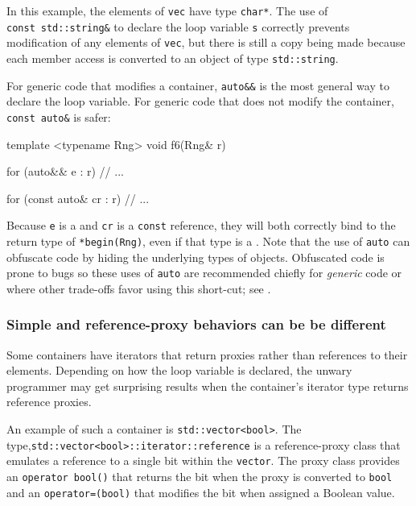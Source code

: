 {{{\noindent In this example, the elements of \lstinline!vec! have type \lstinline!char*!.
The use of \lstinline!const!~\lstinline!std::string&! to declare the loop
variable \lstinline!s! correctly prevents modification of any elements of
\lstinline!vec!, but there is still a copy being made because each member
access is converted to an object of type \lstinline!std::string!.

For generic code that modifies a container, \lstinline!auto&&! is the
most general way to declare the loop variable. For generic code that
does not modify the container, \lstinline!const!~\lstinline!auto&! is safer:

\begin{emcppslisting}[emcppsbatch=e5]
template <typename Rng>
void f6(Rng& r)
{
    for (auto&& e : r)
    {
        // ...
    }

    for (const auto& cr : r)
    {
        // ...
    }
}
\end{emcppslisting}
    

\noindent Because \lstinline!e! is a  and \lstinline!cr! is
a \lstinline!const! reference, they will both correctly bind to the return
type of \lstinline!*begin(Rng)!, even if that type is a .
Note that the use of \lstinline!auto! can obfuscate code by hiding the
underlying types of objects. Obfuscated code is prone to bugs so these
uses of \lstinline!auto! are recommended chiefly for \emph{generic} code or
where other trade-offs favor using this short-cut; see .

\subsubsection[Simple and reference-proxy behaviors can be be different]{Simple and reference-proxy behaviors can be be different}\label{simple-and-reference-proxy-behaviors-can-be-be-different}

Some containers have iterators that return proxies rather than
references to their elements. Depending on how the loop variable is
declared, the unwary programmer may get surprising results when the
container's iterator type returns reference proxies.

An example of such a container is \lstinline!std::vector<bool>!. The type,\linebreak[4]
\lstinline!std::vector<bool>::iterator::reference! is a reference-proxy
class that emulates a reference to a single bit within the
\lstinline!vector!. The proxy class provides an
\lstinline!operator!~\lstinline!bool()! that returns the bit when the proxy is
converted to \lstinline!bool! and an \lstinline!operator=(bool)! that modifies
the bit when assigned a Boolean value.

}}}
